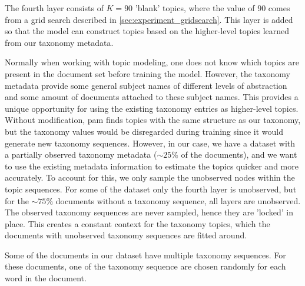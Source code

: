 The fourth layer consists of $K = 90$ 'blank' topics, where the value of $90$ comes from a grid search described in \autoref{sec:experiment_gridsearch}.
This layer is added so that the model can construct topics based on the higher-level topics learned from our taxonomy metadata.



Normally when working with topic modeling, one does not know which topics are present in the document set before training the model.
However, the taxonomy metadata provide some general subject names of different levels of abstraction and some amount of documents attached to these subject names.
This provides a unique opportunity for using the existing taxonomy entries as higher-level topics.
Without modification, \gls{pam} finds topics with the same structure as our taxonomy, but the taxonomy values would be disregarded during training since it would generate new taxonomy sequences.
However, in our case, we have a dataset with a partially observed taxonomy metadata (${\sim}25\%$ of the documents), and we want to use the existing metadata information to estimate the topics quicker and more accurately.
To account for this, we only sample the unobserved nodes within the topic sequences.
For some of the dataset only the fourth layer is unobserved, but for the ${\sim}75\%$ documents without a taxonomy sequence, all layers are unobserved.
The observed taxonomy sequences are never sampled, hence they are 'locked' in place.
This creates a constant context for the taxonomy topics, which the documents with unobserved taxonomy sequences are fitted around.

Some of the documents in our dataset have multiple taxonomy sequences.
For these documents, one of the taxonomy sequence are chosen randomly for each word in the document. 
